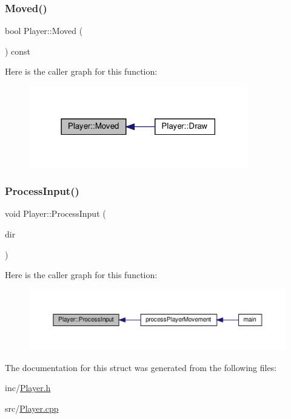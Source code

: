 \subsubsection{\texorpdfstring{Moved()}{Moved()}}
{\footnotesize\ttfamily bool Player\+::\+Moved (\begin{DoxyParamCaption}{ }\end{DoxyParamCaption}) const}

Here is the caller graph for this function\+:
\nopagebreak
\begin{figure}[H]
\begin{center}
\leavevmode
\includegraphics[width=270pt]{structPlayer_a743da3dcbc81ed11bfcb81943aae175b_icgraph}
\end{center}
\end{figure}
\mbox{\label{structPlayer_a4b275c51f881fb61b52d1ede3d1dcba3}} 
\subsubsection{\texorpdfstring{Process\+Input()}{ProcessInput()}}
{\footnotesize\ttfamily void Player\+::\+Process\+Input (\begin{DoxyParamCaption}\item[{\hyperlink{Player_8h_aa91f5cffa9b1b82e96c8824b1fe5c61f}{Movement\+Dir}}]{dir }\end{DoxyParamCaption})}

Here is the caller graph for this function\+:
\nopagebreak
\begin{figure}[H]
\begin{center}
\leavevmode
\includegraphics[width=350pt]{structPlayer_a4b275c51f881fb61b52d1ede3d1dcba3_icgraph}
\end{center}
\end{figure}


The documentation for this struct was generated from the following files\+:\begin{DoxyCompactItemize}
\item 
inc/\hyperlink{Player_8h}{Player.\+h}\item 
src/\hyperlink{Player_8cpp}{Player.\+cpp}\end{DoxyCompactItemize}
